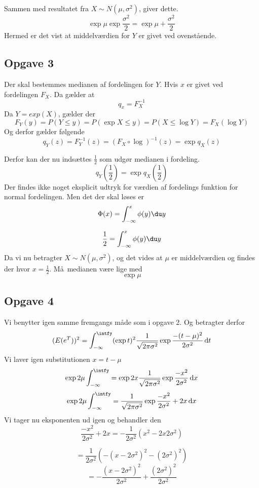 Sammen med resultatet fra $X \sim N(\mu, \sigma^2)$, giver dette.
\[
\exp{\mu} \exp{\frac{\sigma^2}{2}} = \exp{\mu + \frac{\sigma^2}{2}}
\]
Hermed er det vist at middelv\ae rdien for $Y$ er givet ved ovenst\aa ende.


\subsection{Opgave 3}

Der skal bestemmes medianen af fordelingen for $Y$. Hvis $x$ er givet ved fordelingen $F_{X}$. Da g\ae lder at
\[
q_x = F_{X}^{-1}
\]
Da $Y = exp(X)$, g\ae lder der
\[
F_{Y}(y) = P(Y \leq y) = P(\exp{X} \leq y) = P(X \leq \log{Y}) = F_{X}(\log{Y})
\]
Og derfor g\ae lder f\o lgende
\[
q_{Y}(z) = F_{Y}^{-1}(z) = (F_{X} \circ \log)^{-1}(z) = \exp{q_{X}(z)} 
\]

Derfor kan der nu inds\ae ttes $\frac{1}{2}$ som udg\o r medianen i fordeling.
\[
q_{Y}(\frac{1}{2}) = \exp{q_{X}(\frac{1}{2})}
\]
Der findes ikke noget eksplicit udtryk for v\ae rdien af fordelings funktion for normal fordelingen. Men det der skal l\o ses er
\[
\Phi(x) = \int_{-\infty}^{x} \phi(y) \du y
\]

\[
\frac{1}{2} = \int_{-\infty}^{x} \phi(y) \du y
\]
Da vi nu betragter $X \sim N(\mu, \sigma^2)$, og det vides at $\mu$ er middelv\ae rdien og findes der hvor $x = \frac{1}{2}$. M\aa\ medianen v\ae re lige med
\[
\exp{\mu}
\]

\subsection{Opgave 4}

Vi benytter igen samme fremgangs m\aa de som i opgave 2. Og betragter derfor
\[
(E(e^{T}))^2 = \int_{-\infty}^{\intfy} (\exp{t})^{2} \frac{1}{\sqrt{2\pi\sigma^{2}}} \exp{\frac{-(t - \mu)^{2}}{2\sigma^{2}}} \ud t
\]
Vi laver igen substitutionen $x = t - \mu$
\[
\exp{2\mu} \int_{-\infty}^{\intfy} = \exp{2x} \frac{1}{\sqrt{2\pi\sigma^{2}}} \exp{\frac{-x^{2}}{2\sigma^{2}}} \ud x
\]
\[
\exp{2\mu} \int_{-\infty}^{\intfy} = \frac{1}{\sqrt{2\pi\sigma^{2}}} \exp{\frac{-x^{2}}{2\sigma^{2}}+2x} \ud x
\]
Vi tager nu eksponenten ud igen og behandler den
\[
\frac{-x^{2}}{2\sigma^{2}}+2x = -\frac{1}{2\sigma^2}\left( x^2 - 2x2\sigma^2 \right)
\]

\[
= \frac{1}{2\sigma^2}\left( -\left(x - 2\sigma^2 \right)^2 - \left( 2\sigma^2 \right)^2 \right)
\]
\[
= -\frac{(x - 2\sigma^2)^2}{2\sigma^2} + \frac{(2\sigma^2)^2}{2\sigma^2}
\]

